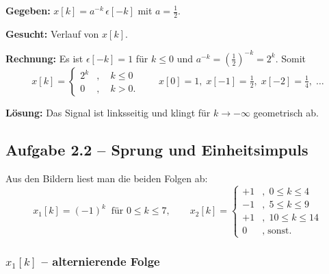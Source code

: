 \begin{beispiel}

\textbf{Gegeben:} $x[k] = a^{-k}\,\epsilon[-k]$ mit $a=\tfrac12$.

\textbf{Gesucht:} Verlauf von $x[k]$.

\textbf{Rechnung:} Es ist $\epsilon[-k]=1$ für $k\leq 0$ und
$a^{-k} = \left(\tfrac12\right)^{-k} = 2^{k}$. Somit
$$
x[k] = \begin{cases} 2^{k} & , \quad k \leq 0 \\ 0 & , \quad k > 0. \end{cases}
\qquad
x[0]=1,\; x[-1]=\tfrac12,\; x[-2]=\tfrac14,\; \ldots
$$

\textbf{Lösung:} Das Signal ist linksseitig und klingt für $k\to -\infty$
geometrisch ab.
\begin{center}
\end{center}
\end{beispiel}

\subsection*{Aufgabe 2.2 – Sprung und Einheitsimpuls}

Aus den Bildern liest man die beiden Folgen ab:
$$
x_1[k] = (-1)^k \;\; \text{für } 0\leq k\leq 7,
\qquad
x_2[k] = \begin{cases} +1 & , \; 0\leq k\leq 4 \\ -1 & , \; 5\leq k\leq 9 \\ +1 & , \; 10\leq k\leq 14 \\ 0 & , \; \text{sonst.} \end{cases}
$$

\subsubsection*{$x_1[k]$ -- alternierende Folge}


